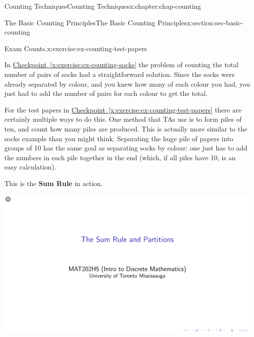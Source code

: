 \documentclass[oneside,10pt,]{book}
\newcommand{\xreffont}{\relax}
\newcommand{\terminology}[1]{\textbf{#1}}
\numberwithin{equation}{section}
\newlength{\qrsize}
\newlength{\previewwidth}
\begin{document}
\begin{chapterptx}{Counting Techniques}{}{Counting Techniques}{}{}{x:chapter:chap-counting}
\begin{sectionptx}{The Basic Counting Principles}{}{The Basic Counting Principles}{}{}{x:section:sec-basic-counting}
\begin{inlineexercise}{Exam Counts.}{x:exercise:ex-counting-test-papers}
\end{inlineexercise}
In \hyperref[x:exercise:ex-counting-socks]{Checkpoint~{\xreffont\ref{x:exercise:ex-counting-socks}}} the problem of counting the total number of pairs of socks had a straightforward solution. Since the socks were already separated by colour, and you knew how many of each colour you had, you just had to add the number of pairs for each colour to get the total.%
\par
For the test papers in \hyperref[x:exercise:ex-counting-test-papers]{Checkpoint~{\xreffont\ref{x:exercise:ex-counting-test-papers}}} there are certainly multiple ways to do this. One method that TAs use is to form piles of ten, and count how many piles are produced. This is actually more similar to the socks example than you might think. Separating the huge pile of papers into groups of 10 has the same goal as separating socks by colour: one just has to add the numbers in each pile together in the end (which, if all piles have 10, is an easy calculation).%
\par
This is the \terminology{Sum Rule} in action.%
\begin{sidebyside}{1}{0}{0}{0}%
\begin{sbspanel}{1}%
\setlength{\qrsize}{9em}
\setlength{\previewwidth}{\linewidth}
\addtolength{\previewwidth}{-\qrsize}
\begin{tcbraster}[raster columns=2, raster column skip=1pt, raster halign=center, raster force size=false, raster left skip=0pt, raster right skip=0pt]%
\begin{tcolorbox}[previewstyle, width=\previewwidth]%
\includegraphics[width=0.80\linewidth,height=\qrsize,keepaspectratio]{images/02-thumb.png}%
\end{tcolorbox}%
\begin{tcolorbox}[qrstyle]%
{\hypersetup{urlcolor=black}}%
\end{tcolorbox}%

\end{tcbraster}
\end{sbspanel}
\end{sidebyside}
\end{sectionptx}
\end{chapterptx}
\end{document}
